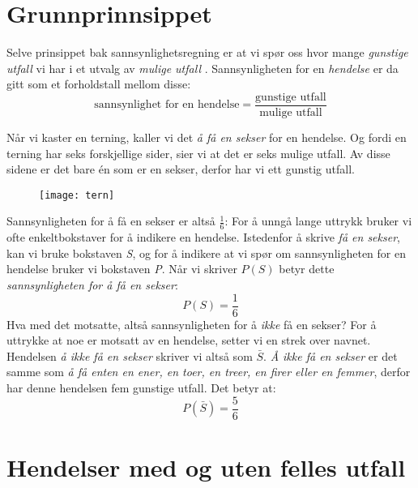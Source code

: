 

%


\section{Grunnprinnsippet}
\setlength\itemsep{0 pt}
Selve prinsippet bak sannsynlighetsregning er at vi spør oss hvor mange \textit{gunstige utfall}  vi har i et utvalg av \textit{mulige utfall} . Sannsynligheten for en \textit{hendelse} er da gitt som et forholdstall mellom disse:
$$\text{sannsynlighet for en hendelse}=\frac{\text{gunstige utfall}}{\text{mulige utfall}}$$

Når vi kaster en terning, kaller vi det \textit{å få en sekser} for en hendelse. Og fordi en terning har seks forskjellige sider, sier vi at det er seks mulige utfall. Av disse sidene er det bare én som er en sekser, derfor har vi ett gunstig utfall. 
\begin{figure}[H]
	\centering
	\texttt{[image: tern]}
\end{figure}Sannsynligheten for å få en sekser er altså $ \frac{1}{6} $:
For å unngå lange uttrykk bruker vi ofte enkeltbokstaver for å indikere en hendelse. Istedenfor å skrive \textit{få en sekser}, kan vi bruke bokstaven \textit{S}, og for å indikere at vi spør om sannsynligheten for en hendelse bruker vi bokstaven \textit{P}. Når vi skriver $P(S)$ betyr dette \textit{sannsynligheten for å få en sekser}:
\[ P(S)=\frac{1}{6} \]
Hva med det motsatte, altså sannsynligheten for å \textsl{ikke} få en sekser? For å uttrykke at noe er motsatt av en hendelse, setter vi en strek over navnet. Hendelsen \textit{å ikke få en sekser} skriver vi altså som $ \bar{S} $. \textit{Å ikke få en sekser} er det samme som \textit{å få enten en ener, en toer, en treer, en firer eller en femmer}, derfor har denne hendelsen fem gunstige utfall. Det betyr at:
\[ P(\bar{S})=\frac{5}{6} \]
\section{Hendelser med og uten felles utfall}
